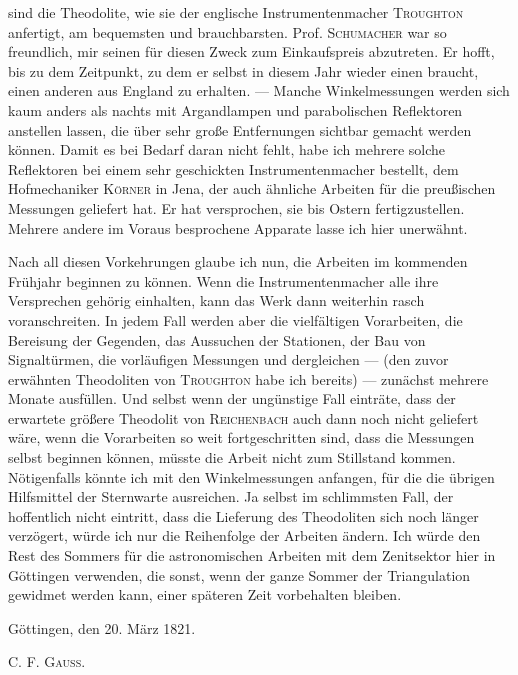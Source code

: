 %
sind die Theodolite, wie sie der englische Instrumentenmacher \textsc{Troughton} anfertigt, am bequemsten und brauchbarsten. Prof. \textsc{Schumacher} war so freundlich, mir seinen für diesen Zweck zum Einkaufspreis abzutreten. Er hofft, bis zu dem Zeitpunkt, zu dem er selbst in diesem Jahr wieder einen braucht, einen anderen aus England zu erhalten. — Manche Winkelmessungen werden sich kaum anders als nachts mit Argandlampen und parabolischen Reflektoren anstellen lassen, die über sehr große Entfernungen sichtbar gemacht werden können. Damit es bei Bedarf daran nicht fehlt, habe ich mehrere solche Reflektoren bei einem sehr geschickten Instrumentenmacher bestellt, dem Hofmechaniker \textsc{Körner} in Jena, der auch ähnliche Arbeiten für die preußischen Messungen geliefert hat. Er hat versprochen, sie bis Ostern fertigzustellen. Mehrere andere im Voraus besprochene Apparate lasse ich hier unerwähnt.

Nach all diesen Vorkehrungen glaube ich nun, die Arbeiten im kommenden Frühjahr beginnen zu können. Wenn die Instrumentenmacher alle ihre Versprechen gehörig einhalten, kann das Werk dann weiterhin rasch voranschreiten. In jedem Fall werden aber die vielfältigen Vorarbeiten, die Bereisung der Gegenden, das Aussuchen der Stationen, der Bau von Signaltürmen, die vorläufigen Messungen und dergleichen — (den zuvor erwähnten Theodoliten von \textsc{Troughton} habe ich bereits) — zunächst mehrere Monate ausfüllen. Und selbst wenn der ungünstige Fall einträte, dass der erwartete größere Theodolit von \textsc{Reichenbach} auch dann noch nicht geliefert wäre, wenn die Vorarbeiten so weit fortgeschritten sind, dass die Messungen selbst beginnen können, müsste die Arbeit nicht zum Stillstand kommen. Nötigenfalls könnte ich mit den Winkelmessungen anfangen, für die die übrigen Hilfsmittel der Sternwarte ausreichen. Ja selbst im schlimmsten Fall, der hoffentlich nicht eintritt, dass die Lieferung des Theodoliten sich noch länger verzögert, würde ich nur die Reihenfolge der Arbeiten ändern. Ich würde den Rest des Sommers für die astronomischen Arbeiten mit dem Zenitsektor hier in Göttingen verwenden, die sonst, wenn der ganze Sommer der Triangulation gewidmet werden kann, einer späteren Zeit vorbehalten bleiben.

Göttingen, den 20. März 1821.
\begin{flushright}C. F. \textsc{Gauss}.\end{flushright}

